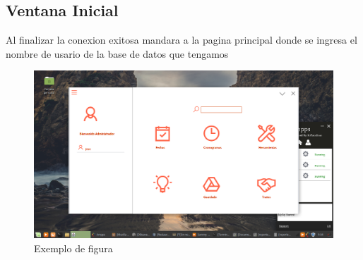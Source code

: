 \documentclass[10pt,a4paper]{report}
\begin{document}

\begin{titlepage}
\begin{flushleft}
\section{Ventana Inicial}
Al finalizar la conexion exitosa mandara a la pagina principal donde se ingresa el nombre de usario de la base de datos que tengamos \par 
 \vspace{.5cm} 
\begin{figure}[ht]
\centering
\includegraphics[width=1\textwidth]{19.png}
\caption{Exemplo de figura}
\label{fig:figura1}
\end{figure}

\end{flushleft}
\end{titlepage}
\end{document}
